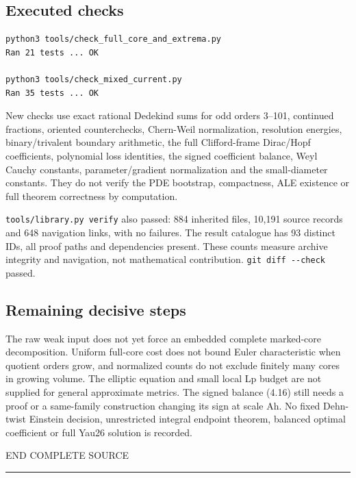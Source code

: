 \documentclass[
  10pt,
]{article}
\begin{document}
\hypertarget{executed-checks}{%
\subsection{Executed checks}\label{executed-checks}}

\begin{verbatim}
python3 tools/check_full_core_and_extrema.py
Ran 21 tests ... OK

python3 tools/check_mixed_current.py
Ran 35 tests ... OK
\end{verbatim}

New checks use exact rational Dedekind sums for odd orders 3--101,
continued fractions, oriented counterchecks, Chern-Weil normalization,
resolution energies, binary/trivalent boundary arithmetic, the full
Clifford-frame Dirac/Hopf coefficients, polynomial loss identities, the
signed coefficient balance, Weyl Cauchy constants, parameter/gradient
normalization and the small-diameter constants. They do not verify the
PDE bootstrap, compactness, ALE existence or full theorem correctness by
computation.

\texttt{tools/library.py\ verify} also passed: 884 inherited files,
10,191 source records and 648 navigation links, with no failures. The
result catalogue has 93 distinct IDs, all proof paths and dependencies
present. These counts measure archive integrity and navigation, not
mathematical contribution. \texttt{git\ diff\ -\/-check} passed.

\hypertarget{remaining-decisive-steps}{%
\subsection{Remaining decisive steps}\label{remaining-decisive-steps}}

The raw weak input does not yet force an embedded complete marked-core
decomposition. Uniform full-core cost does not bound Euler
characteristic when quotient orders grow, and normalized counts do not
exclude finitely many cores in growing volume. The elliptic equation and
small local Lp budget are not supplied for general approximate metrics.
The signed balance (4.16) still needs a proof or a same-family
construction changing its sign at scale Ah. No fixed Dehn-twist Einstein
decision, unrestricted integral endpoint theorem, balanced optimal
coefficient or full Yau26 solution is recorded.

END COMPLETE SOURCE

\begin{center}\rule{0.5\linewidth}{0.5pt}\end{center}
\end{document}
